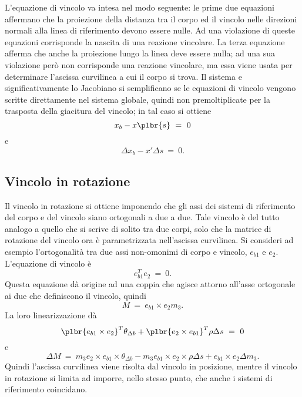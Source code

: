 \documentclass[12pt,dvips,fleqn,italian]{article}
\begin{document}
L'equazione di vincolo va intesa nel modo seguente: le prime due equazioni
affermano che la proiezione della distanza tra il corpo ed il vincolo nelle
direzioni normali alla linea di riferimento devono essere nulle. 
Ad una violazione di queste equazioni corrisponde la nascita di una reazione
vincolare.
La terza equazione afferma che anche la proiezione lungo la linea deve
essere nulla; ad una sua violazione per\`{o} non corrisponde una reazione
vincolare, ma essa viene usata per determinare l'ascissa curvilinea a cui il
corpo si trova.
Il sistema e significativamente lo Jacobiano si semplificano se le equazioni
di vincolo vengono scritte direttamente nel sistema globale, quindi non
premoltiplicate per la trasposta della giacitura del vincolo; in tal caso si
ottiene
\begin{displaymath}
    x_b - x\plbr{s} \ = \ 0
\end{displaymath}
e 
\begin{displaymath}
    \Delta{x_b} - x' \Delta{s} \ = \ 0 .
\end{displaymath}



\subsection*{Vincolo in rotazione}
Il vincolo in rotazione si ottiene imponendo che gli assi dei sistemi di
riferimento del corpo e del vincolo siano ortogonali a due a due.
Tale vincolo \`{e} del tutto analogo a quello che si scrive di solito tra
due corpi, solo che la matrice di rotazione del vincolo ora \`{e}
parametrizzata nell'ascissa curvilinea.
Si consideri ad esempio l'ortogonalit\`{a} tra due assi non-omonimi di corpo
e vincolo, $ e_{b1} $ e $ e_2 $.
L'equazione di vincolo \`{e}
\begin{displaymath}
    e_{b1}^T e_2 \ = \ 0 .
\end{displaymath}
Questa equazione d\`{a} origine ad una coppia che agisce attorno all'asse
ortogonale ai due che definiscono il vincolo, quindi
\begin{displaymath}
    M \ = \ e_{b1} \times e_2 m_3 .
\end{displaymath}
La loro linearizzazione d\`{a}
\begin{displaymath}
    \plbr{ e_{b1} \times e_2 }^T \theta_{\Delta{b}}
    +\plbr{ e_2 \times e_{b1} }^T \rho \Delta{s} \ = \ 0
\end{displaymath}
e
\begin{displaymath}
    \Delta{M} \ = \
        m_3 e_2 \times e_{b1} \times \theta_{\Delta{b}}
	- m_3 e_{b1} \times e_2 \times \rho \Delta{s}
	+ e_{b1} \times e_2 \Delta{m_3} .
\end{displaymath}
Quindi l'ascissa curvilinea viene risolta dal vincolo in posizione, mentre
il vincolo in rotazione si limita ad imporre, nello stesso punto, che anche
i sistemi di riferimento coincidano.
\end{document}
